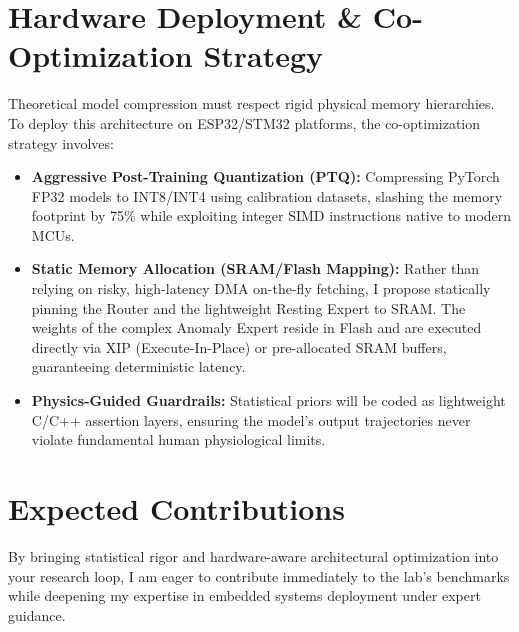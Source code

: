 \documentclass[10pt,a4paper]{article}
\begin{document}
\section{Hardware Deployment \& Co-Optimization Strategy}
\vspace{-2pt}
{\small Theoretical model compression must respect rigid physical memory hierarchies. To deploy this architecture on ESP32/STM32 platforms, the co-optimization strategy involves:
\begin{itemize}
    \item \textbf{Aggressive Post-Training Quantization (PTQ):} Compressing PyTorch FP32 models to INT8/INT4 using calibration datasets, slashing the memory footprint by 75\% while exploiting integer SIMD instructions native to modern MCUs.
    
    \item \textbf{Static Memory Allocation (SRAM/Flash Mapping):} Rather than relying on risky, high-latency DMA on-the-fly fetching, I propose statically pinning the Router and the lightweight Resting Expert to SRAM. The weights of the complex Anomaly Expert reside in Flash and are executed directly via XIP (Execute-In-Place) or pre-allocated SRAM buffers, guaranteeing deterministic latency.
    
    \item \textbf{Physics-Guided Guardrails:} Statistical priors will be coded as lightweight C/C++ assertion layers, ensuring the model's output trajectories never violate fundamental human physiological limits.
\end{itemize}
}

\section{Expected Contributions}
\vspace{-2pt}
{\small By bringing statistical rigor and hardware-aware architectural optimization into your research loop, I am eager to contribute immediately to the lab's benchmarks while deepening my expertise in embedded systems deployment under expert guidance.}
\end{document}
